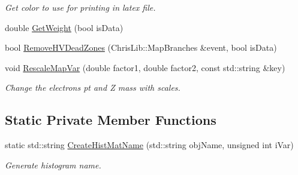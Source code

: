 \begin{DoxyCompactItemize}
\begin{DoxyCompactList}\small\item\em Get color to use for printing in latex file. \end{DoxyCompactList}\item 
double \hyperlink{classTemplateMethod_1_1Template_afa2eaca7a71f08f04fc10c22dfdf339a}{Get\+Weight} (bool is\+Data)
\item 
bool \hyperlink{classTemplateMethod_1_1Template_aba8e85a347ec70cccade1b12ae8c149f}{Remove\+H\+V\+Dead\+Zones} (Chris\+Lib\+::\+Map\+Branches \&event, bool is\+Data)
\item 
void \hyperlink{classTemplateMethod_1_1Template_ac35d248a861b0d7ec3d27edbad2a6b23}{Rescale\+Map\+Var} (double factor1, double factor2, const std\+::string \&key)
\begin{DoxyCompactList}\small\item\em Change the electrons pt and Z mass with scales. \end{DoxyCompactList}\end{DoxyCompactItemize}
\subsection*{Static Private Member Functions}
\begin{DoxyCompactItemize}
\item 
static std\+::string \hyperlink{classTemplateMethod_1_1Template_a670c21e24909a003eeed364495099ebd}{Create\+Hist\+Mat\+Name} (std\+::string obj\+Name, unsigned int i\+Var)
\begin{DoxyCompactList}\small\item\em Generate histogram name. \end{DoxyCompactList}\end{DoxyCompactItemize}
